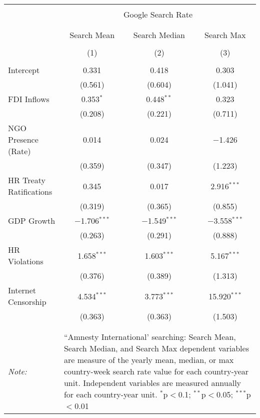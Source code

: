 
\begin{table}[!htbp] \centering 
  \caption{} 
  \label{} 
\begin{tabular}{@{\extracolsep{5pt}}lccc} 
\\[-1.8ex]\hline 
\hline \\[-1.8ex] 
 & \multicolumn{3}{c}{Google Search Rate} \\ 
\cline{2-4} 
\\[-1.8ex] & \multicolumn{3}{c}{ } \\ 
 & Search Mean & Search Median & Search Max \\ 
\\[-1.8ex] & (1) & (2) & (3)\\ 
\hline \\[-1.8ex] 
 Intercept & 0.331 & 0.418 & 0.303 \\ 
  & (0.561) & (0.604) & (1.041) \\ 
  FDI Inflows & 0.353$^{*}$ & 0.448$^{**}$ & 0.323 \\ 
  & (0.208) & (0.221) & (0.711) \\ 
  NGO Presence (Rate) & 0.014 & 0.024 & $-$1.426 \\ 
  & (0.359) & (0.347) & (1.223) \\ 
  HR Treaty Ratifications & 0.345 & 0.017 & 2.916$^{***}$ \\ 
  & (0.319) & (0.365) & (0.855) \\ 
  GDP Growth & $-$1.706$^{***}$ & $-$1.549$^{***}$ & $-$3.558$^{***}$ \\ 
  & (0.263) & (0.291) & (0.888) \\ 
  HR Violations & 1.658$^{***}$ & 1.603$^{***}$ & 5.167$^{***}$ \\ 
  & (0.376) & (0.389) & (1.313) \\ 
  Internet Censorship & 4.534$^{***}$ & 3.773$^{***}$ & 15.920$^{***}$ \\ 
  & (0.363) & (0.363) & (1.503) \\ 
 \hline \\[-1.8ex] 
\hline 
\hline \\[-1.8ex] 
\textit{Note:}  & \multicolumn{3}{l}{\parbox[t]{8cm}{``Amnesty International' searching: Search Mean, Search Median, and Search Max dependent variables are measure of the yearly mean, median, or max country-week search rate value for each country-year unit. Independent variables are measured annually for each country-year unit. $^{*}$p$<$0.1; $^{**}$p$<$0.05; $^{***}$p$<$0.01}} \\ 
\end{tabular} 
\end{table} 
